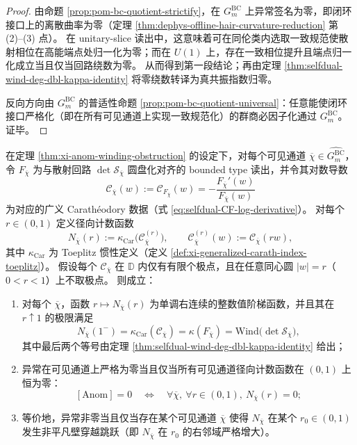 \begin{proof}
由命题 \ref{prop:pom-bc-quotient-strictify}，在 \(G^{\mathrm{BC}}_m\) 上异常签名为零，即闭环接口上的离散曲率为零（定理 \ref{thm:dephys-offline-hair-curvature-reduction} 第 (2)–(3) 点）。
在 unitary-slice 读出中，这意味着可在同伦类内选取一致规范使散射相位在高能端点处归一化为零；而在 \(U(1)\) 上，存在一致相位提升且端点归一化成立当且仅当回路绕数为零。
从而得到第一段结论；再由定理 \ref{thm:selfdual-wind-deg-dbl-kappa-identity} 将零绕数转译为真共振指数归零。
\par
反向方向由 \(G^{\mathrm{BC}}_m\) 的普适性命题 \ref{prop:pom-bc-quotient-universal}：任意能使闭环接口严格化（即在所有可见通道上实现一致规范化）的群商必因子化通过 \(G^{\mathrm{BC}}_m\)。证毕。
\end{proof}

\begin{theorem}\label{thm:xi-visible-anom-iff-radial-wallcrossing}
在定理 \ref{thm:xi-anom-winding-obstruction} 的设定下，对每个可见通道 \(\overline\chi\in\widehat{G^{\mathrm{BC}}_m}\)，令 \(F_{\overline\chi}\) 为与散射回路 \(\det\mathcal S_{\overline\chi}\) 圆盘化对齐的 bounded type 读出，并令其对数导数
\[
\mathscr{C}_{\overline\chi}(w):=\mathscr{C}_{F_{\overline\chi}}(w)=-\frac{F_{\overline\chi}'(w)}{F_{\overline\chi}(w)}
\]
为对应的广义 Carath\'eodory 数据（式 \eqref{eq:selfdual-CF-log-derivative}）。
对每个 \(r\in(0,1)\) 定义径向计数函数
\[
N_{\overline\chi}(r):=\kappa_{\mathrm{Car}}\!\bigl(\mathscr{C}_{\overline\chi}^{(r)}\bigr),
 \qquad
\mathscr{C}_{\overline\chi}^{(r)}(w):=\mathscr{C}_{\overline\chi}(rw),
\]
其中 \(\kappa_{\mathrm{Car}}\) 为 Toeplitz 惯性定义（定义 \ref{def:xi-generalized-carath-index-toeplitz}）。
假设每个 \(\mathscr{C}_{\overline\chi}\) 在 \(\mathbb{D}\) 内仅有有限个极点，且在任意同心圆 \(|w|=r\)（\(0<r<1\)）上不取极点。
则成立：
\begin{enumerate}
  \item 对每个 \(\overline\chi\)，函数 \(r\mapsto N_{\overline\chi}(r)\) 为单调右连续的整数值阶梯函数，并且其在 \(r\uparrow 1\) 的极限满足
  \[
  N_{\overline\chi}(1^-)=\kappa_{\mathrm{Car}}(\mathscr{C}_{\overline\chi})=\kappa(F_{\overline\chi})=\mathrm{Wind}\bigl(\det\mathcal S_{\overline\chi}\bigr),
  \]
  其中最后两个等号由定理 \ref{thm:selfdual-wind-deg-dbl-kappa-identity} 给出；
  \item 异常在可见通道上严格为零当且仅当所有可见通道径向计数函数在 \((0,1)\) 上恒为零：
  \[
  [\mathrm{Anom}]=0
  \quad\Longleftrightarrow\quad
  \forall\overline\chi,\ \forall r\in(0,1),\ N_{\overline\chi}(r)=0;
  \]
  \item 等价地，异常非零当且仅当存在某个可见通道 \(\overline\chi\) 使得 \(N_{\overline\chi}\) 在某个 \(r_0\in(0,1)\) 发生非平凡壁穿越跳跃（即 \(N_{\overline\chi}\) 在 \(r_0\) 的右邻域严格增大）。
\end{enumerate}
\end{theorem}
